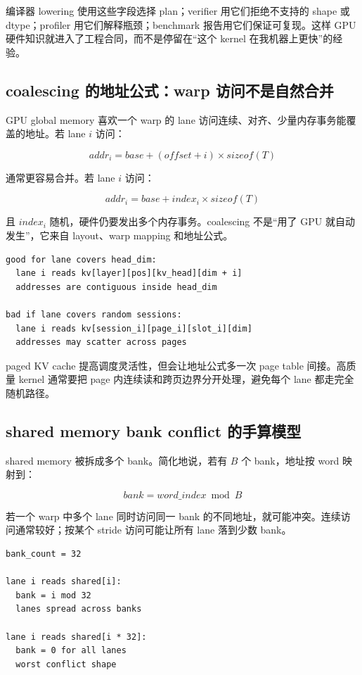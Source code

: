 编译器 lowering 使用这些字段选择 plan；verifier 用它们拒绝不支持的 shape 或 dtype；profiler 用它们解释瓶颈；benchmark 报告用它们保证可复现。这样 GPU 硬件知识就进入了工程合同，而不是停留在“这个 kernel 在我机器上更快”的经验。

\subsection{coalescing 的地址公式：warp 访问不是自然合并}

GPU global memory 喜欢一个 warp 的 lane 访问连续、对齐、少量内存事务能覆盖的地址。若 lane \(i\) 访问：

\[
addr_i = base + (offset + i) \times sizeof(T)
\]

通常更容易合并。若 lane \(i\) 访问：

\[
addr_i = base + index_i \times sizeof(T)
\]

且 \(index_i\) 随机，硬件仍要发出多个内存事务。coalescing 不是“用了 GPU 就自动发生”，它来自 layout、warp mapping 和地址公式。

\begin{lstlisting}[numbers=none,caption={KV cache 两种 warp 地址流}]
good for lane covers head_dim:
  lane i reads kv[layer][pos][kv_head][dim + i]
  addresses are contiguous inside head_dim

bad if lane covers random sessions:
  lane i reads kv[session_i][page_i][slot_i][dim]
  addresses may scatter across pages
\end{lstlisting}

paged KV cache 提高调度灵活性，但会让地址公式多一次 page table 间接。高质量 kernel 通常要把 page 内连续读和跨页边界分开处理，避免每个 lane 都走完全随机路径。

\subsection{shared memory bank conflict 的手算模型}

shared memory 被拆成多个 bank。简化地说，若有 \(B\) 个 bank，地址按 word 映射到：

\[
bank = word\_index \bmod B
\]

若一个 warp 中多个 lane 同时访问同一 bank 的不同地址，就可能冲突。连续访问通常较好；按某个 stride 访问可能让所有 lane 落到少数 bank。

\begin{lstlisting}[numbers=none,caption={bank conflict 的 stride 直觉}]
bank_count = 32

lane i reads shared[i]:
  bank = i mod 32
  lanes spread across banks

lane i reads shared[i * 32]:
  bank = 0 for all lanes
  worst conflict shape
\end{lstlisting}

